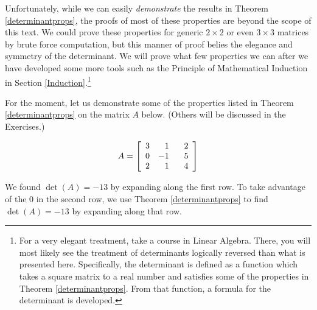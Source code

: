 \documentclass{ximera}
\begin{document}
\smallskip

Unfortunately, while we can easily \textit{demonstrate} the results in Theorem \ref{determinantprops}, the proofs of most of these properties are beyond the scope of this text.  We could prove these properties for generic $2 \times 2$ or even $3 \times 3$ matrices by brute force computation, but this manner of proof belies the elegance and symmetry of the determinant.  We will prove what few properties we can after we have developed some more tools such as the Principle of Mathematical Induction in Section \ref{Induction}.\footnote{For a very elegant treatment, take a course in Linear Algebra.  There, you will most likely see the treatment of determinants logically reversed than what is presented here.  Specifically, the determinant is defined as a function which takes a square matrix to a real number and satisfies some of the properties in Theorem \ref{determinantprops}. From that function, a formula for the determinant is developed.}  

For the moment, let us demonstrate some of the properties listed in Theorem \ref{determinantprops} on the matrix $A$ below.  (Others will be discussed in the Exercises.)

\[A =  \left[ \begin{array}{rrr} 3 & 1 & \hphantom{-}2 \\ 0 & -1 & 5 \\ 2 & 1 & 4 \\ \end{array} \right] \]

We found $\det(A) = -13$ by expanding along the first row.  To take advantage of the $0$ in the second row, we use Theorem \ref{determinantprops} to find $\det(A) = -13$ by expanding along that row.
\end{document}

